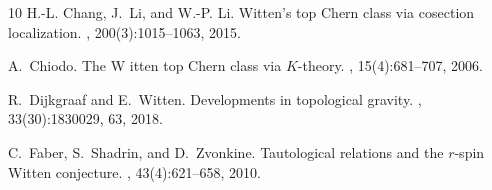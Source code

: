 \documentclass[11pt]{amsart}
\theoremstyle{definition}
\theoremstyle{remark}
\newcommand{\<}{\left<}
\renewcommand{\>}{\right>}
\numberwithin{equation}{section}
\begin{document}
\begin{thebibliography}{10}
H.-L. Chang, J.~Li, and %
W.-P. Li.
\newblock Witten's top %
{C}hern class via cosection localization.
, 200(3):1015--1063, 2015.

A.~Chiodo.
\newblock The {W%
}itten top {C}hern class via {$K$}-theory.
, 15(4):681--707, 2006.

R.~Dijkgraaf and %
E.~Witten.
\newblock Developments in %
topological gravity.
, 33(30):1830029, 63, 2018.

C.~Faber, S.~Shadrin, and %
D.~Zvonkine.
\newblock Tautological relations %
and the {$r$}-spin {W}itten conjecture.
, 43(4):621--658, 2010.


\end{thebibliography}
\end{document}
